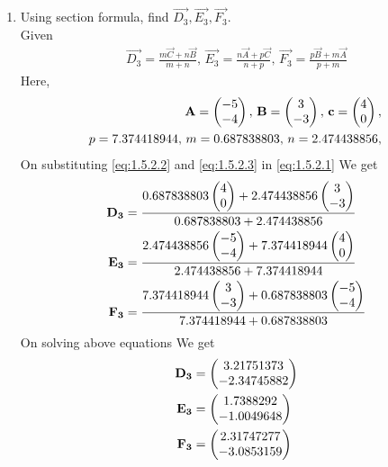 \documentclass[10pt]{book}
\begin{document}
\begin{enumerate}[label=\thesection.\arabic*.,ref=\thesection.\theenumi]
\item Using section formula, find $\vec{D_3}, \vec{E_3}, \vec{F_3}$. \\
\solution Given
\begin{align}
			\vec{D_3} = \frac{m\vec{C}+n\vec{B}}{m+n},\,
			\vec{E_3} = \frac{n\vec{A}+p\vec{C}}{n+p},\,
			\vec{F_3} = \frac{p\vec{B}+m\vec{A}}{p+m} 
                \label{eq:1.5.2.1}
\end{align}
Here,
\begin{align}
    \vec{A}=\myvec{-5 \\ -4},\,
    \vec{B}=\myvec{3\\-3},\,
    \vec{c}=\myvec{4\\0},\, \label{eq:1.5.2.2} \\
     p = 7.374418944 ,\,
     m = 0.687838803 ,\,
     n = 2.474438856 ,\,  \label{eq:1.5.2.3}
\end{align}
On substituting \eqref{eq:1.5.2.2} and \eqref{eq:1.5.2.3} in \eqref{eq:1.5.2.1} We get
\begin{align}
    \mathbf{D_3} &= \frac{0.687838803\begin{pmatrix}4 \\ 0\end{pmatrix} +  2.474438856 \begin{pmatrix}3\\-3\end{pmatrix}}{0.687838803+2.474438856 } \\
    \mathbf{E_3} &= \frac{2.474438856 \begin{pmatrix}-5 \\ -4\end{pmatrix} + 7.374418944\begin{pmatrix}4\\0\end{pmatrix}}{2.474438856+7.374418944} \\
    \mathbf{F_3} &= \frac{7.374418944\begin{pmatrix}3 \\ -3\end{pmatrix} +  0.687838803\begin{pmatrix}-5\\-4\end{pmatrix}}{7.374418944+ 0.687838803}
\end{align}
On solving above equations We get 
\begin{align}
    \mathbf{D_3} &= \begin{pmatrix}3.21751373 \\ -2.34745882\end{pmatrix} \\
    \mathbf{E_3} &= \begin{pmatrix}1.7388292 \\ -1.0049648\end{pmatrix} \\
    \mathbf{F_3} &= \begin{pmatrix}2.31747277 \\ -3.0853159 \end{pmatrix} 
\end{align}
\begin{figure}[H]
    \centering

\end{figure}
\end{enumerate}
\end{document}
